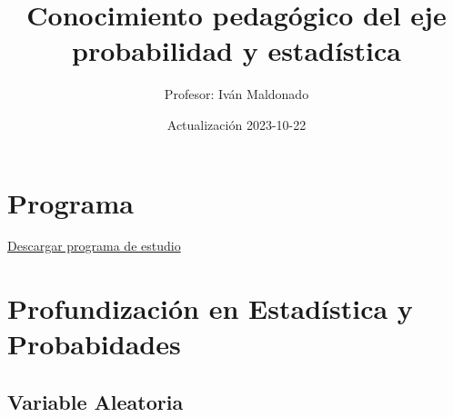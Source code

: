 \documentclass[
]{book}
\title{Conocimiento pedagógico del eje probabilidad y estadística}
\author{Profesor: Iván Maldonado}
\date{Actualización 2023-10-22}
\begin{document}
\maketitle

{
\setcounter{tocdepth}{1}
\tableofcontents
}
\hypertarget{programa}{%
\chapter*{Programa}\label{programa}}

\href{https://correouss-my.sharepoint.com/:b:/g/personal/imaldonadoc1_docente_uss_cl/EXfiKuJSO7JCle9L_86S0EMBeDkr3OyYHprvy0Rc0Jj4mQ?e=JcPOWy}{Descargar programa de estudio}

\hypertarget{profundizaciuxf3n-en-estaduxedstica-y-probabidades}{%
\chapter{Profundización en Estadística y Probabidades}\label{profundizaciuxf3n-en-estaduxedstica-y-probabidades}}

\hypertarget{variable-aleatoria}{%
\section{Variable Aleatoria}\label{variable-aleatoria}}
\end{document}
